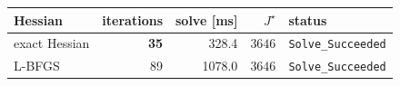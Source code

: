 \begin{tabular}{lrrrl}
  \toprule
  Hessian & iterations & solve [ms] & $J^\star$ & status \\
  \midrule
  exact Hessian & \textbf{35} & 328.4 & $3646$ & \texttt{Solve\_Succeeded} \\
  L-BFGS & 89 & 1078.0 & $3646$ & \texttt{Solve\_Succeeded} \\
  \bottomrule
\end{tabular}
